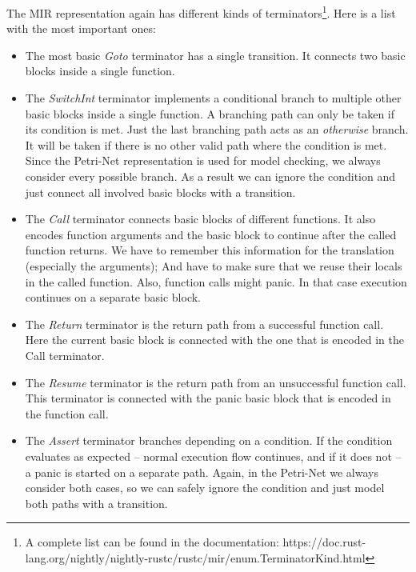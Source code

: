 The MIR representation again has different kinds of terminators\footnote{A complete list can be found in the documentation: https://doc.rust-lang.org/nightly/nightly-rustc/rustc/mir/enum.TerminatorKind.html}. Here is a list with the most important ones:
\begin{itemize}
    \item The most basic \textit{Goto} terminator has a single transition.
    It connects two basic blocks inside a single function.
    \item The \textit{SwitchInt} terminator implements a conditional branch to multiple other basic blocks inside a single function.
    A branching path can only be taken if its condition is met.
    Just the last branching path acts as an \textit{otherwise} branch.
    It will be taken if there is no other valid path where the condition is met.
    Since the Petri-Net representation is used for model checking, we always consider every possible branch.
    As a result we can ignore the condition and just connect all involved basic blocks with a transition.
    \item The \textit{Call} terminator connects basic blocks of different functions.
    It also encodes function arguments and the basic block to continue after the called function returns.
    We have to remember this information for the translation (especially the arguments);
    And have to make sure that we reuse their locals in the called function.
    Also, function calls might panic.
    In that case execution continues on a separate basic block.
    \item The \textit{Return} terminator is the return path from a successful function call.
    Here the current basic block is connected with the one that is encoded in the Call terminator.
    \item The \textit{Resume} terminator is the return path from an unsuccessful function call.
    This terminator is connected with the panic basic block that is encoded in the function call.
    \item The \textit{Assert} terminator branches depending on a condition.
    If the condition evaluates as expected -- normal execution flow continues, and if it does not -- a panic is started on a separate path.
    Again, in the Petri-Net we always consider both cases, so we can safely ignore the condition and just model both paths with a transition.
\end{itemize}

